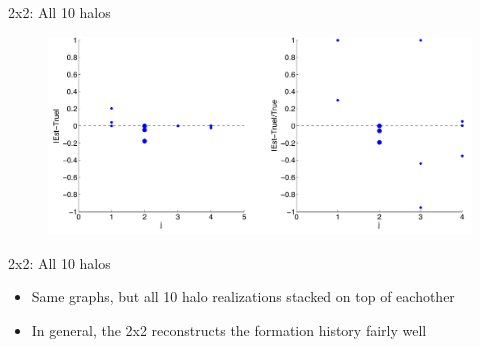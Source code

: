 \documentclass{beamer}
\begin{document}
\begin{frame}{2x2: All 10 halos}
	
	\begin{figure}
			\begin{center}
				\includegraphics[scale=0.30]{s4t2m7allpctdiff.pdf}
			\end{center}
	\end{figure}	
	
\end{frame}
\begin{frame}[shrink]{2x2: All 10 halos}
	
	\begin{itemize}
		\item Same graphs, but all 10 halo realizations stacked on top of eachother
		\item In general, the 2x2 reconstructs the formation history fairly well
	\end{itemize}
	
\end{frame}
\end{document}
